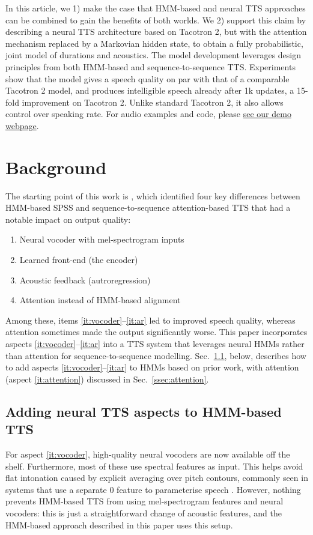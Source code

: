 \documentclass[british]{article}
\newcommand{\webpage}{https://shivammehta007.github.io/Neural-HMM/}
\begin{document}
In this article, we 1) make the case that HMM-based and neural TTS approaches can be combined to gain the benefits of both worlds.
We 2) support this claim by describing a neural TTS architecture based on Tacotron 2, but with the attention mechanism replaced by a Markovian hidden state, to obtain a fully probabilistic, joint model of durations and acoustics.
The model development leverages design principles from both HMM-based and sequence-to-sequence TTS.
Experiments show that the model gives
a speech quality on par with that of a comparable Tacotron 2 model, and produces intelligible speech already after 1k updates, a 15-fold improvement on Tacotron 2.
Unlike standard Tacotron 2, it also allows control over speaking rate.
For audio examples and code, please \href{\webpage}{see our demo webpage}.


\section{Background}
\label{sec:background}
The starting point of this work is \cite{watts2019where}, which identified four key differences between HMM-based SPSS
and sequence-to-sequence attention-based TTS
that had a notable impact on output quality:
\begin{enumerate}
\item \label{it:vocoder} Neural vocoder with mel-spectrogram inputs
\item \label{it:frontend} Learned front-end (the encoder)
\item \label{it:ar} Acoustic feedback (autroregression)
\item \label{it:attention} Attention instead of HMM-based alignment
\end{enumerate}
Among these, items \ref{it:vocoder}--\ref{it:ar} led to improved speech quality, whereas attention
sometimes made the output significantly worse.
This paper incorporates
aspects \ref{it:vocoder}--\ref{it:ar} into a TTS system that leverages neural HMMs \cite{tran2016unsupervised,yu2016online} rather than attention for sequence-to-sequence modelling.
Sec.\ \ref{ssec:upgrading}, below, describes how to add aspects \ref{it:vocoder}--\ref{it:ar} to HMMs based on prior work, with attention (aspect \ref{it:attention}) discussed in Sec.\ \ref{ssec:attention}.

\subsection{Adding neural TTS aspects to HMM-based TTS}
\label{ssec:upgrading}
For aspect \ref{it:vocoder}, high-quality neural vocoders are now available off the shelf.
Furthermore, most of these use spectral features as input.
This helps avoid flat intonation caused by explicit averaging over pitch contours, commonly seen in systems that use a separate 0 feature to parameterise speech \cite{watts2019where}.
However, nothing prevents HMM-based TTS from using mel-spectrogram features and neural vocoders: this is just a straightforward change of acoustic features, and the HMM-based approach described in this paper uses this setup.
\end{document}
